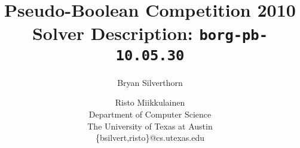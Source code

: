 \documentclass[letterpaper]{article}
\title{Pseudo-Boolean Competition 2010 Solver Description: {\tt borg-pb-10.05.30}}
\author{Bryan Silverthorn \and Risto Miikkulainen\\
Department of Computer Science\\
The University of Texas at Austin\\
\{bsilvert,risto\}@cs.utexas.edu}
\begin{document}
\nocopyright
\maketitle








\end{document}
